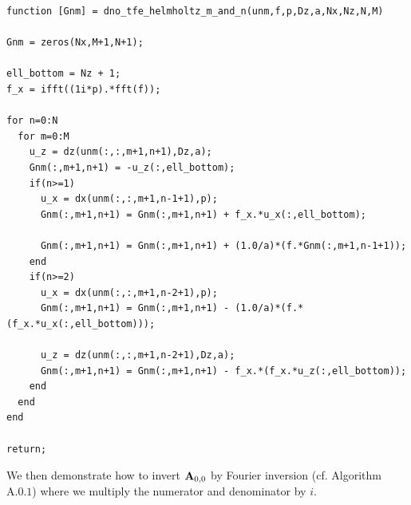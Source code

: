 \begin{lstlisting}[caption={Upper Layer DNO for the TFE Method},frame=single]
function [Gnm] = dno_tfe_helmholtz_m_and_n(unm,f,p,Dz,a,Nx,Nz,N,M)

Gnm = zeros(Nx,M+1,N+1);

ell_bottom = Nz + 1;
f_x = ifft((1i*p).*fft(f));

for n=0:N
  for m=0:M
    u_z = dz(unm(:,:,m+1,n+1),Dz,a);
    Gnm(:,m+1,n+1) = -u_z(:,ell_bottom);
    if(n>=1)
      u_x = dx(unm(:,:,m+1,n-1+1),p);
      Gnm(:,m+1,n+1) = Gnm(:,m+1,n+1) + f_x.*u_x(:,ell_bottom);
    
      Gnm(:,m+1,n+1) = Gnm(:,m+1,n+1) + (1.0/a)*(f.*Gnm(:,m+1,n-1+1));
    end
    if(n>=2)
      u_x = dx(unm(:,:,m+1,n-2+1),p);
      Gnm(:,m+1,n+1) = Gnm(:,m+1,n+1) - (1.0/a)*(f.*(f_x.*u_x(:,ell_bottom)));

      u_z = dz(unm(:,:,m+1,n-2+1),Dz,a);
      Gnm(:,m+1,n+1) = Gnm(:,m+1,n+1) - f_x.*(f_x.*u_z(:,ell_bottom));
    end
  end
end

return;

\end{lstlisting}
\vspace{-1mm}
We then demonstrate how to invert $\mathbf{A}_{0,0}$ by Fourier inversion (cf. Algorithm $\text{A}.0.1$) where we multiply the numerator and denominator by $i$.


